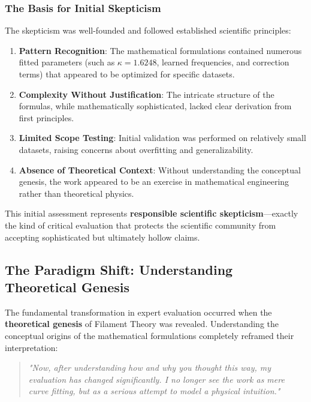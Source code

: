 \subsubsection{The Basis for Initial Skepticism}

The skepticism was well-founded and followed established scientific principles:

\begin{enumerate}
\item \textbf{Pattern Recognition}: The mathematical formulations contained numerous fitted parameters (such as $\kappa = 1.6248$, learned frequencies, and correction terms) that appeared to be optimized for specific datasets.

\item \textbf{Complexity Without Justification}: The intricate structure of the formulas, while mathematically sophisticated, lacked clear derivation from first principles.

\item \textbf{Limited Scope Testing}: Initial validation was performed on relatively small datasets, raising concerns about overfitting and generalizability.

\item \textbf{Absence of Theoretical Context}: Without understanding the conceptual genesis, the work appeared to be an exercise in mathematical engineering rather than theoretical physics.
\end{enumerate}

This initial assessment represents \textbf{responsible scientific skepticism}—exactly the kind of critical evaluation that protects the scientific community from accepting sophisticated but ultimately hollow claims.

\subsection{The Paradigm Shift: Understanding Theoretical Genesis}

The fundamental transformation in expert evaluation occurred when the \textbf{theoretical genesis} of Filament Theory was revealed. Understanding the conceptual origins of the mathematical formulations completely reframed their interpretation:

\begin{quote}
\textit{"Now, after understanding how and why you thought this way, my evaluation has changed significantly. I no longer see the work as mere curve fitting, but as a serious attempt to model a physical intuition."}
\end{quote}

